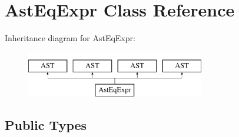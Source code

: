 \hypertarget{classAstEqExpr}{\section{Ast\-Eq\-Expr Class Reference}
\label{classAstEqExpr}
}
Inheritance diagram for Ast\-Eq\-Expr\-:\begin{figure}[H]
\begin{center}
\leavevmode
\includegraphics[height=2.000000cm]{classAstEqExpr}
\end{center}
\end{figure}
\subsection*{Public Types}

